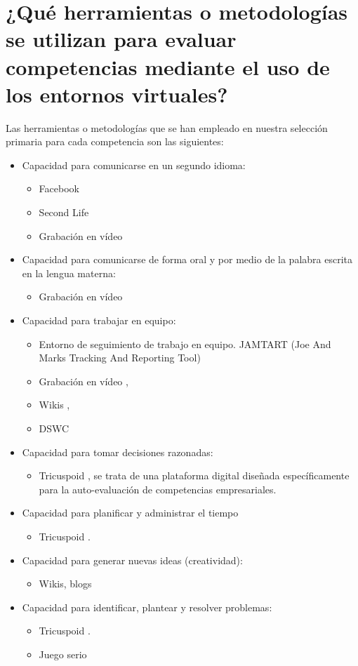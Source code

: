 \section{¿Qué herramientas o metodologías se utilizan para evaluar competencias mediante el uso de los entornos virtuales?}
Las herramientas o metodologías que se han empleado en nuestra selección primaria para cada competencia son las siguientes:
\begin{itemize}
\item Capacidad para comunicarse en un segundo idioma:
	\begin{itemize} 
	\item Facebook \cite{Shih:2011}
	\item Second Life \cite{MercedesRico:2013}
	\item Grabación en vídeo \cite{Masip-Alvarez:2013}
	\end{itemize}
\item Capacidad para comunicarse de forma oral y por medio de la palabra escrita en la lengua materna:
	\begin{itemize} 
	\item Grabación en vídeo \cite{Masip-Alvarez:2013}
	\end{itemize}
\item Capacidad para trabajar en equipo:
	\begin{itemize} 
	\item Entorno de seguimiento de trabajo en equipo. JAMTART (Joe And Marks Tracking And Reporting Tool) \cite{McMahon:2007}
	\item Grabación en vídeo \cite{Masip-Alvarez:2013}, \cite{Martin-Cuadrado:2013}
	\item Wikis \cite{Piedra:2010}, \cite{Lim:2011}
	\item DSWC \cite{Liao:2013}
	\end{itemize}
\item Capacidad para tomar decisiones razonadas:
	\begin{itemize} 
	\item Tricuspoid \cite{Achcaoucaou:2012}, se trata de una plataforma digital diseñada específicamente para la auto-evaluación de competencias empresariales.
	\end{itemize}
\item Capacidad para planificar y administrar el tiempo
	\begin{itemize} 
	\item Tricuspoid \cite{Achcaoucaou:2012}.
	\end{itemize}
\item Capacidad para generar nuevas ideas (creatividad):
	\begin{itemize} 
	\item Wikis, blogs \cite{Piedra:2010}
	\end{itemize}
\item Capacidad para identificar, plantear y resolver problemas:
	\begin{itemize} 
	\item Tricuspoid \cite{Achcaoucaou:2012}.
	\item Juego serio \cite{Guenaga:2013}
	\end{itemize}
\end{itemize}

